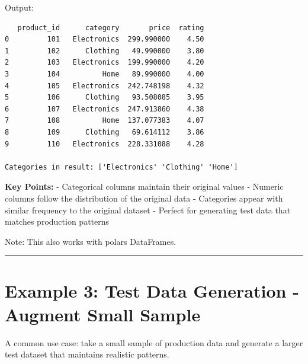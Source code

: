\documentclass[
  letterpaper,
]{scrbook}
\begin{document}
Output:

\begin{verbatim}
   product_id      category       price  rating
0         101   Electronics  299.990000    4.50
1         102      Clothing   49.990000    3.80
2         103   Electronics  199.990000    4.20
3         104          Home   89.990000    4.00
4         105   Electronics  242.748198    4.32
5         106      Clothing   93.508085    3.95
6         107   Electronics  247.913860    4.38
7         108          Home  137.077383    4.07
8         109      Clothing   69.614112    3.86
9         110   Electronics  228.331088    4.28

Categories in result: ['Electronics' 'Clothing' 'Home']
\end{verbatim}

\textbf{Key Points:} - Categorical columns maintain their original
values - Numeric columns follow the distribution of the original data -
Categories appear with similar frequency to the original dataset -
Perfect for generating test data that matches production patterns

Note: This also works with polars DataFrames.

\begin{center}\rule{0.5\linewidth}{0.5pt}\end{center}

\section{Example 3: Test Data Generation - Augment Small
Sample}\label{example-3-test-data-generation---augment-small-sample}

A common use case: take a small sample of production data and generate a
larger test dataset that maintains realistic patterns.
\end{document}

